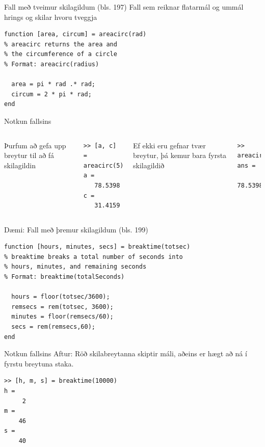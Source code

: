 \documentclass{beamer}
\begin{document}
\begin{frame}[fragile]{Fall með tveimur skilagildum (bls. 197)}
\vspace{\baselineskip}
Fall sem reiknar flatarmál og ummál hrings og skilar hvoru tveggja
\begin{verbatim}
function [area, circum] = areacirc(rad)
% areacirc returns the area and 
% the circumference of a circle
% Format: areacirc(radius)
    
  area = pi * rad .* rad;
  circum = 2 * pi * rad;
end
\end{verbatim}
\end{frame}

\begin{frame}[fragile]{Notkun fallsins}
\begin{columns}
Þurfum að gefa upp breytur til að fá skilagildin
\begin{verbatim}
>> [a, c] = areacirc(5)
a =
   78.5398
c =
   31.4159
\end{verbatim}
Ef ekki eru gefnar tvær breytur, þá kemur bara fyrsta skilagildið
\begin{verbatim}
>> areacirc(5)
ans =
   78.5398
\end{verbatim}
\end{columns}
\end{frame}

\begin{frame}[fragile]{Dæmi: Fall með þremur skilagildum (bls. 199)}
\vspace{\baselineskip}
\begin{verbatim}
function [hours, minutes, secs] = breaktime(totsec)
% breaktime breaks a total number of seconds into
% hours, minutes, and remaining seconds
% Format: breaktime(totalSeconds)

  hours = floor(totsec/3600);
  remsecs = rem(totsec, 3600);
  minutes = floor(remsecs/60);
  secs = rem(remsecs,60);
end
\end{verbatim}
\end{frame}

\begin{frame}[fragile]{Notkun fallsins}
Aftur: Röð skilabreytanna skiptir máli, aðeins er hægt að ná í fyrstu breytuna staka.
\begin{verbatim}
>> [h, m, s] = breaktime(10000)
h =
     2
m =
    46
s =
    40
\end{verbatim}

\end{frame}
\end{document}
